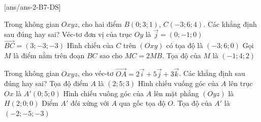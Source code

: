 \cauds
{}[ans/ans-2-B7-DS]
\setcounter{ex}{0}
\begin{ex}%
Trong không gian $Oxyz$, cho hai điểm $B\left( 0;3;1\right)$, $C\left( -3;6;4\right)$. Các khẳng định sau đúng hay sai?
\choiceTF
{Véc-tơ đơn vị của trục $ Oy $ là $ \overrightarrow{j}=(0;-1;0) $}
{$ \overrightarrow{BC}=\left(3;-3;-3\right) $}
{\True Hình chiếu của $ C $ trên $ \left(Oxy\right) $ có tọa độ là $ \left(-3;6;0\right) $}
{\True Gọi $M$ là điểm nằm trên đoạn $BC$ sao cho $MC=2MB$. Tọa độ của $ M $ là $ \left( -1;4;2\right) $}
\end{ex}
\begin{ex}%
	Trong không gian $Oxyz$, cho véc-tơ $\overrightarrow{OA}=2\vec{i}+5\vec{j}+3\vec{k}$. Các khẳng định sau đúng hay sai?
	\choiceTF
	{\True Tọa độ điểm $A$ là $(2;5;3)$}
	{Hình chiếu vuống góc của $A$ lên trục $Ox$ là $A'(0;5;0)$}
	{Hình chiếu vuông góc của $A$ lên mặt phẳng $(Oyz)$ là $H(2;0;0)$}
	{\True Điểm $ A' $ đối xứng với $ A $ qua gốc tọa độ $ O $. Tọa độ của $A'$ là $(-2;-5;-3)$}
\end{ex}


